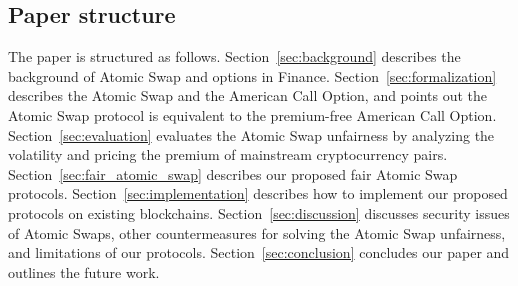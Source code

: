 \subsection{Paper structure}

The paper is structured as follows.
Section~\ref{sec:background} describes the background of Atomic Swap and options in Finance.
Section~\ref{sec:formalization} describes the Atomic Swap and the American Call Option, and points out the Atomic Swap protocol is equivalent to the premium-free American Call Option.
Section~\ref{sec:evaluation} evaluates the Atomic Swap unfairness by analyzing the volatility and pricing the premium of mainstream cryptocurrency pairs.
Section~\ref{sec:fair_atomic_swap} describes our proposed fair Atomic Swap protocols.
Section~\ref{sec:implementation} describes how to implement our proposed protocols on existing blockchains.
Section~\ref{sec:discussion} discusses security issues of Atomic Swaps, other countermeasures for solving the Atomic Swap unfairness, and limitations of our protocols.
Section~\ref{sec:conclusion} concludes our paper and outlines the future work.
